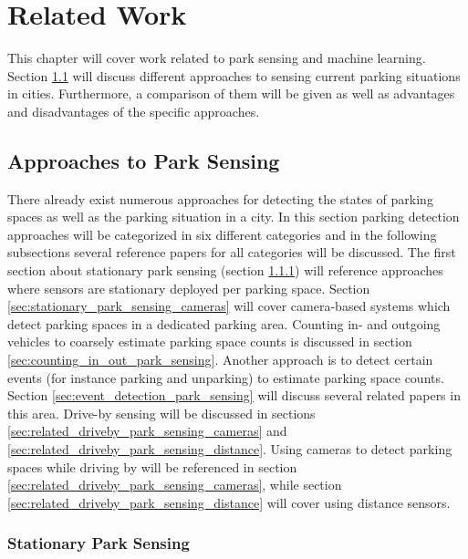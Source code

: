 \chapter{Related Work}
\label{chap:relatedwork}

This chapter will cover work related to park sensing and machine learning. Section \ref{sec:parksensing} will discuss different approaches to sensing current parking situations in cities. Furthermore, a comparison of them will be given as well as advantages and disadvantages of the specific approaches. 



\section{Approaches to Park Sensing}
\label{sec:parksensing}

There already exist numerous approaches for detecting the states of parking spaces as well as the parking situation in a city. In this section parking detection approaches will be categorized in six different categories and in the following subsections several reference papers for all categories will be discussed. The first section about stationary park sensing (section \ref{sec:stationary_park_sensing}) will reference approaches where sensors are stationary deployed per parking space. Section \ref{sec:stationary_park_sensing_cameras} will cover camera-based systems which detect parking spaces in a dedicated parking area. Counting in- and outgoing vehicles to coarsely estimate parking space counts is discussed in section \ref{sec:counting_in_out_park_sensing}. Another approach is to detect certain events (for instance parking and unparking) to estimate parking space counts. Section \ref{sec:event_detection_park_sensing} will discuss several related papers in this area. Drive-by sensing will be discussed in sections \ref{sec:related_driveby_park_sensing_cameras} and \ref{sec:related_driveby_park_sensing_distance}. Using cameras to detect parking spaces while driving by will be referenced in section \ref{sec:related_driveby_park_sensing_cameras}, while section \ref{sec:related_driveby_park_sensing_distance} will cover using distance sensors. 



\subsection{Stationary Park Sensing}
\label{sec:stationary_park_sensing}

